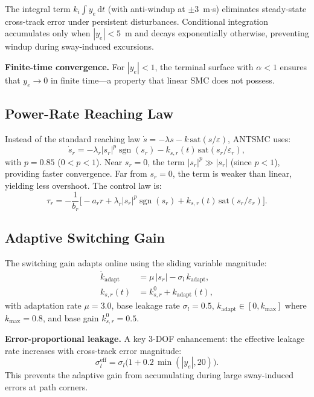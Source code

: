 \documentclass[review]{cas-dc}
\begin{document}
The integral term $k_i\!\int\!y_e\,\mathrm{d}t$ (with anti-windup at $\pm 3$~m$\cdot$s) eliminates steady-state cross-track error under persistent disturbances. Conditional integration accumulates only when $|y_e| < 5$~m and decays exponentially otherwise, preventing windup during sway-induced excursions.

\textbf{Finite-time convergence.} For $|y_e| < 1$, the terminal surface with $\alpha < 1$ ensures that $y_e \to 0$ in finite time---a property that linear SMC does not possess.


\subsection{Power-Rate Reaching Law}
\label{sec:reaching}

Instead of the standard reaching law $\dot{s} = -\lambda s - k\,\mathrm{sat}(s/\varepsilon)$, ANTSMC uses:
\begin{equation}
\dot{s}_r = -\lambda_r |s_r|^p \operatorname{sgn}(s_r) - k_{s,r}(t)\,\mathrm{sat}(s_r/\varepsilon_r),
\label{eq:reaching}
\end{equation}
with $p = 0.85$ ($0 < p < 1$). Near $s_r = 0$, the term $|s_r|^p \gg |s_r|$ (since $p < 1$), providing faster convergence. Far from $s_r = 0$, the term is weaker than linear, yielding less overshoot. The control law is:
\begin{equation}
\tau_r = -\frac{1}{b_r}\Big[-a_r r + \lambda_r |s_r|^p \operatorname{sgn}(s_r) + k_{s,r}(t)\,\mathrm{sat}(s_r/\varepsilon_r)\Big].
\label{eq:ctrl_law}
\end{equation}


\subsection{Adaptive Switching Gain}
\label{sec:adaptive}

The switching gain adapts online using the sliding variable magnitude:
\begin{align}
\dot{k}_{\mathrm{adapt}} &= \mu\,|s_r| - \sigma_l\, k_{\mathrm{adapt}}, \label{eq:adapt}\\
k_{s,r}(t) &= k_{s,r}^0 + k_{\mathrm{adapt}}(t), \label{eq:gain_total}
\end{align}
with adaptation rate $\mu = 3.0$, base leakage rate $\sigma_l = 0.5$, $k_{\mathrm{adapt}} \in [0, k_{\max}]$ where $k_{\max} = 0.8$, and base gain $k_{s,r}^0 = 0.5$.

\textbf{Error-proportional leakage.} A key 3-DOF enhancement: the effective leakage rate increases with cross-track error magnitude:
\begin{equation}
\sigma_l^{\mathrm{eff}} = \sigma_l\big(1 + 0.2\,\min(|y_e|, 20)\big).
\label{eq:leakage}
\end{equation}
This prevents the adaptive gain from accumulating during large sway-induced errors at path corners.
\end{document}
